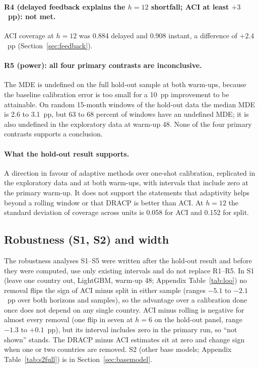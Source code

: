 \paragraph{R4 (delayed feedback explains the $h=12$ shortfall; ACI at least $+3$~pp): not met.} ACI coverage at $h=12$ was 0.884 delayed and 0.908 instant, a difference of $+2.4$~pp (Section~\ref{sec:feedback}).

\paragraph{R5 (power): all four primary contrasts are inconclusive.} The MDE is undefined on the full hold-out sample at both warm-ups, because the baseline calibration error is too small for a 10~pp improvement to be attainable. On random 15-month windows of the hold-out data the median MDE is 2.6 to 3.1~pp, but 63 to 68 percent of windows have an undefined MDE; it is also undefined in the exploratory data at warm-up 48. None of the four primary contrasts supports a conclusion.

\paragraph{What the hold-out result supports.} A direction in favour of adaptive methods over one-shot calibration, replicated in the exploratory data and at both warm-ups, with intervals that include zero at the primary warm-up. It does not support the statements that adaptivity helps beyond a rolling window or that DRACP is better than ACI. At $h=12$ the standard deviation of coverage across units is 0.058 for ACI and 0.152 for split.

\subsection{Robustness (S1, S2) and width}\label{sec:width}

The robustness analyses S1--S5 were written after the hold-out result and before they were computed, use only existing intervals and do not replace R1--R5. In S1 (leave one country out, LightGBM, warm-up 48; Appendix Table~\ref{tab:loo}) no removal flips the sign of ACI minus split in either sample (ranges $-5.1$ to $-2.1$~pp over both horizons and samples), so the advantage over a calibration done once does not depend on any single country. ACI minus rolling is negative for almost every removal (one flip in seven at $h=6$ on the hold-out panel, range $-1.3$ to $+0.1$~pp), but its interval includes zero in the primary run, so ``not shown'' stands. The DRACP minus ACI estimates sit at zero and change sign when one or two countries are removed. S2 (other base models; Appendix Table~\ref{tab:s2full}) is in Section~\ref{sec:basemodel}.

